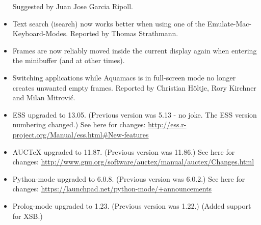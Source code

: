 \begin{itemize}
Suggested by Juan Jose Garcia Ripoll.
\item Text search (isearch) now works better when using one of the Emulate-Mac-Keyboard-Modes.
Reported by Thomas Strathmann.
\item Frames are now reliably moved inside the current display again when entering the minibuffer (and at other times).
\item Switching applications while Aquamacs is in full-screen mode no longer creates unwanted empty frames.
Reported by Christian H\"o{}ltje, Rory Kirchner and Milan Mitrovi\'c{}.
\item ESS upgraded to 13.05. (Previous version was 5.13 - no joke. The ESS version numbering changed.) See here for changes: \url{http://ess.r-project.org/Manual/ess.html#New-features}
\item AUCTeX upgraded to 11.87. (Previous version was 11.86.) See here for changes: \url{http://www.gnu.org/software/auctex/manual/auctex/Changes.html}
\item Python-mode upgraded to 6.0.8.  (Previous version was 6.0.2.)  See here for changes: \url{https://launchpad.net/python-mode/+announcements}
\item Prolog-mode upgraded to 1.23. (Previous version was 1.22.)  (Added support for XSB.)
\end{itemize}

